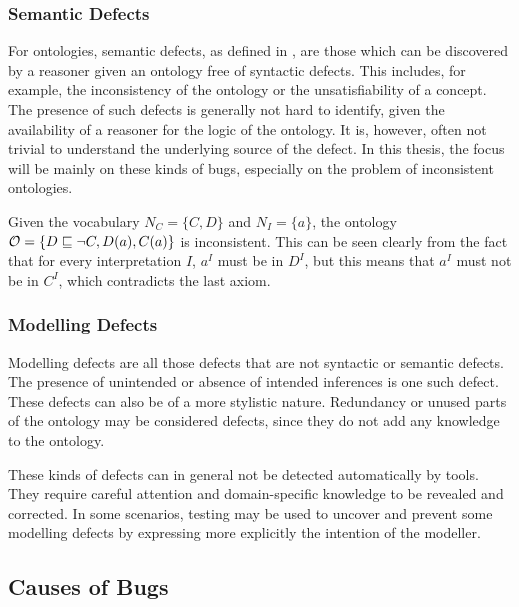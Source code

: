 \subsubsection{Semantic Defects} \label{semantic-defects}

For ontologies, semantic defects, as defined in \cite{kalyanpur2005debugging}, are those which can be discovered by a reasoner given an ontology free of syntactic defects. This includes, for example, the inconsistency of the ontology or the unsatisfiability of a concept. The presence of such defects is generally not hard to identify, given the availability of a reasoner for the logic of the ontology. It is, however, often not trivial to understand the underlying source of the defect. In this thesis, the focus will be mainly on these kinds of bugs, especially on the problem of inconsistent ontologies.

\begin{example}
  Given the vocabulary $N_C = \{ C, D \}$ and $N_I = \{ a \}$, the \SROIQ ontology $\mathcal{O} = \{ D \sqsubseteq \lnot C, D(a), C(a) \}$ is inconsistent. This can be seen clearly from the fact that for every interpretation $I$, $a^I$ must be in $D^I$, but this means that $a^I$ must not be in $C^I$, which contradicts the last axiom.
\end{example}

\subsubsection{Modelling Defects} \label{modelling-defects}

Modelling defects are all those defects that are not syntactic or semantic defects. The presence of unintended or absence of intended inferences is one such defect. These defects can also be of a more stylistic nature. Redundancy or unused parts of the ontology may be considered defects, since they do not add any knowledge to the ontology.

These kinds of defects can in general not be detected automatically by tools. They require careful attention and domain-specific knowledge to be revealed and corrected. In some scenarios, testing may be used to uncover and prevent some modelling defects by expressing more explicitly the intention of the modeller.

\subsection{Causes of Bugs} \label{causes-of-bugs}

